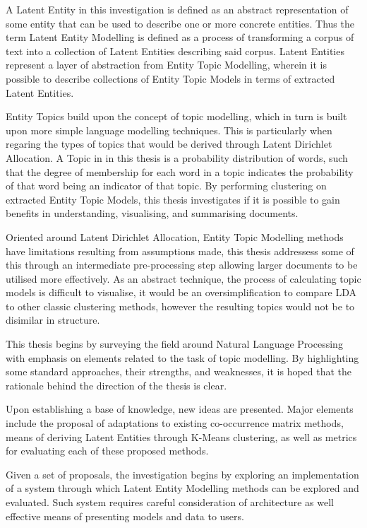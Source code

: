 \documentclass[10pt]{report}
\begin{document}
A Latent Entity in this investigation is defined as an abstract representation of some entity that can be used to describe one or more concrete entities. Thus the term Latent Entity Modelling is defined as a process of transforming a corpus of text into a collection of Latent Entities describing said corpus. Latent Entities represent a layer of abstraction from Entity Topic Modelling, wherein it is possible to describe collections of Entity Topic Models in terms of extracted Latent Entities.

Entity Topics build upon the concept of topic modelling, which in turn is built upon more simple language modelling techniques. This is particularly when regaring the types of topics that would be derived through Latent Dirichlet Allocation. A Topic in in this thesis is a probability distribution of words, such that the degree of membership for each word in a topic indicates the probability of that word being an indicator of that topic. By performing clustering on extracted Entity Topic Models, this thesis investigates if it is possible to gain benefits in understanding, visualising, and summarising documents. 

Oriented around Latent Dirichlet Allocation, Entity Topic Modelling methods have limitations resulting from assumptions made, this thesis addressess some of this through an intermediate pre-processing step allowing larger documents to be utilised more effectively. As an abstract technique, the process of calculating topic models is difficult to visualise, it would be an oversimplification to compare LDA to other classic clustering methods, however the resulting topics would not be to disimilar in structure.

This thesis begins by surveying the field around Natural Language Processing with emphasis on elements related to the task of topic modelling. By highlighting some standard approaches, their strengths, and weaknesses, it is hoped that the rationale behind the direction of the thesis is clear.

Upon establishing a base of knowledge, new ideas are presented. Major elements include the proposal of adaptations to existing co-occurrence matrix methods, means of deriving Latent Entities through K-Means clustering, as well as metrics for evaluating each of these proposed methods.

Given a set of proposals, the investigation begins by exploring an implementation of a system through which Latent Entity Modelling methods can be explored and evaluated. Such system requires careful consideration of architecture as well effective means of presenting models and data to users.
\end{document}
